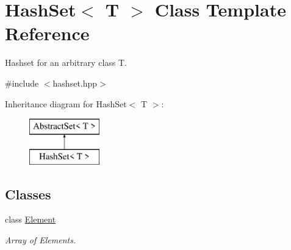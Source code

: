 \hypertarget{class_hash_set}{\section{Hash\-Set$<$ T $>$ Class Template Reference}
\label{class_hash_set}
}


Hashset for an arbitrary class T.  




{\ttfamily \#include $<$hashset.\-hpp$>$}

Inheritance diagram for Hash\-Set$<$ T $>$\-:\begin{figure}[H]
\begin{center}
\leavevmode
\includegraphics[height=2.000000cm]{class_hash_set}
\end{center}
\end{figure}
\subsection*{Classes}
\begin{DoxyCompactItemize}
\item 
class \hyperlink{class_hash_set_1_1_element}{Element}
\begin{DoxyCompactList}\small\item\em Array of Elements. \end{DoxyCompactList}\end{DoxyCompactItemize}
